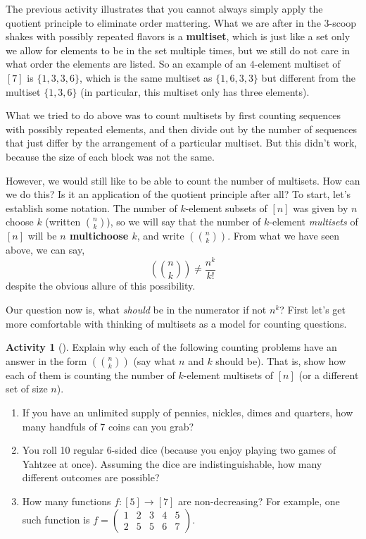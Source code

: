 \documentclass[10pt,]{book}
\newcommand{\terminology}[1]{\textbf{#1}}
\theoremstyle{plain}
\theoremstyle{definition}
\theoremstyle{definition}
\theoremstyle{definition}
\newtheorem{activity}[project]{Activity}
\numberwithin{equation}{chapter}
\newcommand{\mchoose}[2]{\left(\!\binom{#1}{#2}\!\right)}
\newcommand{\twoline}[2]{\begin{pmatrix}#1 \\ #2 \end{pmatrix}}
\newcommand{\amp}{&}
\begin{document}
\hypertarget{p-808}{}%
The previous activity illustrates that you cannot always simply apply the quotient principle to eliminate order mattering.  What we are after in the 3-scoop shakes with possibly repeated flavors is a \terminology{multiset}, which is just like a set only we allow for elements to be in the set multiple times, but we still do not care in what order the elements are listed.  So an example of an \(4\)-element multiset of \([7]\) is \(\{1,3,3,6\}\), which is the same multiset as \(\{1,6,3,3\}\) but different from the multiset \(\{1,3,6\}\) (in particular, this multiset only has three elements).%
\par
\hypertarget{p-809}{}%
What we tried to do above was to count multisets by first counting sequences with possibly repeated elements, and then divide out by the number of sequences that just differ by the arrangement of a particular multiset.  But this didn't work, because the size of each block was not the same.%
\par
\hypertarget{p-810}{}%
However, we would still like to be able to count the number of multisets.  How can we do this?  Is it an application of the quotient principle after all?  To start, let's establish some notation.  The number of \(k\)-element subsets of \([n]\) was given by \(n\) choose \(k\) (written \(\binom{n}{k}\)), so we will say that the number of \(k\)-element \emph{multisets} of \([n]\) will be \terminology{\(n\) multichoose \(k\)}, and write \(\mchoose{n}{k}\).  From what we have seen above, we can say,%
\begin{equation*}
\mchoose{n}{k} \ne \frac{n^k}{k!}
\end{equation*}
despite the obvious allure of this possibility.%
\par
\hypertarget{p-811}{}%
Our question now is, what \emph{should} be in the numerator if not \(n^k\)?  First let's get more comfortable with thinking of multisets as a model for counting questions.%
\begin{activity}[]\label{activity-113}
\hypertarget{p-812}{}%
Explain why each of the following counting problems have an answer in the form \(\mchoose{n}{k}\) (say what \(n\) and \(k\) should be).  That is, show how each of them is counting the number of \(k\)-element multisets of \([n]\) (or a different set of size \(n\)).%
\begin{enumerate}[font=\bfseries,label=(\alph*),ref=\alph*]
\item\label{task-153} \hypertarget{p-813}{}%
If you have an unlimited supply of pennies, nickles, dimes and quarters, how many handfuls of 7 coins can you grab?%
\item\label{task-154} \hypertarget{p-814}{}%
You roll 10 regular 6-sided dice (because you enjoy playing two games of Yahtzee at once).  Assuming the dice are indistinguishable, how many different outcomes are possible?%
\item\label{task-155} \hypertarget{p-815}{}%
How many functions \(f:[5] \to [7]\) are non-decreasing?  For example, one such function is \(f = \twoline{1 \amp 2 \amp 3 \amp 4 \amp 5}{2 \amp 5 \amp 5 \amp 6 \amp 7}\).%
\end{enumerate}
\end{activity}
\end{document}
